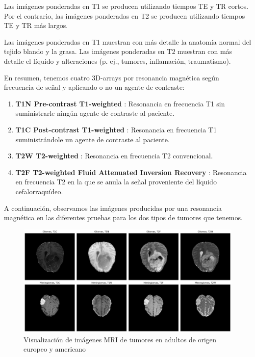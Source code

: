 Las imágenes ponderadas en T1 se producen utilizando tiempos TE y TR cortos. Por el contrario, las imágenes ponderadas en T2 se producen utilizando tiempos TE y TR más largos.

Las imágenes ponderadas en T1 muestran con más detalle la anatomía normal del tejido blando y la grasa. Las imágenes ponderadas en T2 muestran con más detalle el líquido y alteraciones (p. ej., tumores, inflamación, traumatismo). 

En resumen, tenemos cuatro 3D-arrays por resonancia magnética según frecuencia de señal y aplicando o no un agente de contraste:

\begin{enumerate}
	\item \textbf{T1N Pre-contrast T1-weighted} :  Resonancia en frecuencia T1 sin suministrarle ningún agente de contraste al paciente.
	\item \textbf{T1C Post-contrast T1-weighted} : Resonancia en frecuencia T1 suministrándole un agente de contraste al paciente.
	\item \textbf{T2W T2-weighted} : Resonancia en frecuencia T2 convencional.
	\item \textbf{T2F T2-weighted Fluid Attenuated Inversion Recovery} : Resonancia en frecuencia T2 en la que se anula la señal proveniente del líquido cefalorraquídeo.
\end{enumerate}

A continuación, observamos las imágenes producidas por una resonancia magnética en las diferentes pruebas para los dos tipos de tumores que tenemos.

\begin{figure}[!h]
	\centering
	\includegraphics[width=1.0\linewidth]{imagenes/introduccion_imagenesMRI.png}
	\caption{Visualización de imágenes MRI de tumores en adultos de origen europeo y americano}
	\label{fig:visual0}
\end{figure}

